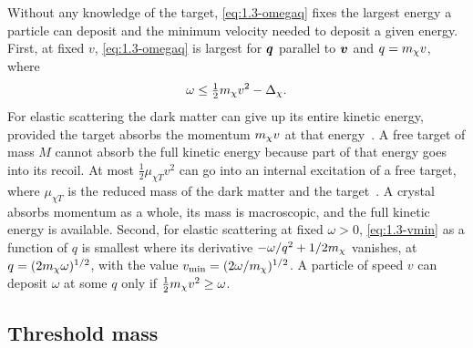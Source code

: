 Without any knowledge of the target, \cref{eq:1.3-omegaq} fixes the largest energy a particle can deposit and the minimum velocity needed to deposit a given energy. First, at fixed $v$, \cref{eq:1.3-omegaq} is largest for $\bm{q}$ parallel to $\bm{v}$ and $q = m_{\chi} v$, where
\begin{equation}
  \omega \le \tfrac12m_{\chi} v^2 - \Delta_\chi .
  \label{eq:1.3-omegamax}
\end{equation}
For elastic scattering the dark matter can give up its entire kinetic energy, provided the target absorbs the momentum $m_{\chi} v$ at that energy~\cite[Eq.~(119)]{lin2019tasi}. A free target of mass $M$ cannot absorb the full kinetic energy because part of that energy goes into its recoil. At most $\tfrac12\mu_{\chi T}v^2$ can go into an internal excitation of a free target, where $\mu_{\chi T}$ is the reduced mass of the dark matter and the target~\cite[Eq.~(3.4)]{essig2016direct}. A crystal absorbs momentum as a whole, its mass is macroscopic, and the full kinetic energy is available. Second, for elastic scattering at fixed $\omega > 0$, \cref{eq:1.3-vmin} as a function of $q$ is smallest where its derivative $-\omega/q^2 + 1/2m_{\chi}$ vanishes, at $q = (2m_{\chi}\omega)^{1/2}$, with the value $v_{\mathrm{min}} = (2\omega/m_{\chi})^{1/2}$. A particle of speed $v$ can deposit $\omega$ at some $q$ only if $\tfrac12m_{\chi} v^2 \ge \omega$.

\subsection{Threshold mass}

